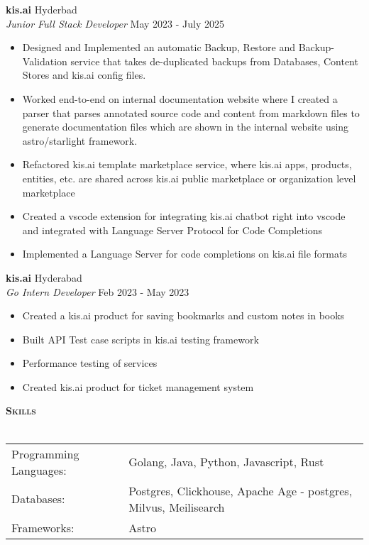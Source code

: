 \documentclass[a4paper]{article}
\newcommand{\lineunder} {
    \vspace*{-8pt} \\
    \hspace*{-18pt} \hrulefill \\
}
\newcommand{\header} [1] {
    {\hspace*{-18pt}\vspace*{6pt} \textbf{\textsc{#1}}}
    \vspace*{-6pt} \lineunder
}
\begin{document}
\textbf{kis.ai} \hfill Hyderbad\\
\textit{Junior Full Stack Developer} \hfill May 2023 - July 2025\\
\vspace{-1mm}
\begin{itemize} \itemsep 1pt
	\item Designed and Implemented an automatic Backup, Restore and Backup-Validation service that takes de-duplicated backups from Databases, Content Stores and kis.ai config files.
	\item Worked end-to-end on internal documentation website where I created a parser that parses annotated source code and content from markdown files to generate documentation files which are shown in the internal website using astro/starlight framework.
	\item Refactored kis.ai template marketplace service, where kis.ai apps, products, entities, etc. are shared across kis.ai public marketplace or organization level marketplace
	\item Created a vscode extension for integrating kis.ai chatbot right into vscode and integrated with Language Server Protocol for Code Completions
	\item Implemented a Language Server for code completions on kis.ai file formats
\end{itemize}
\textbf{kis.ai} \hfill Hyderabad\\
\textit{Go Intern Developer} \hfill Feb 2023 - May 2023\\
\vspace{-1mm}
\begin{itemize} \itemsep 1pt
	\item Created a kis.ai product for saving bookmarks and custom notes in books
	\item Built API Test case scripts in kis.ai testing framework
	\item Performance testing of services
	\item Created kis.ai product for ticket management system
\end{itemize}

\header{Skills}
\begin{tabular}{ l l }
	Programming Languages: & Golang, Java, Python, Javascript, Rust                           \\
	Databases:             & Postgres, Clickhouse, Apache Age - postgres, Milvus, Meilisearch \\
	Frameworks:            & Astro                                                            \\
\end{tabular}
\vspace{2mm}
\end{document}
